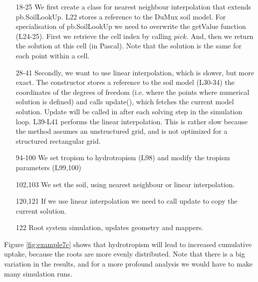 \begin{itemize}
\item[18-25] We first create a class for nearest neighbour interpolation that extends pb.SoilLookUp. L22 stores a reference to the DuMux soil model. For specialisation of pb.SoilLookUp we need to overwrite the getValue function (L24-25). First we retrieve the cell index by calling $pick$. And, then we return the solution at this cell (in Pascal). Note that the solution is the same for each point within a cell. 
\item[28-41] Secondly, we want to use linear interpolation, which is slower, but more exact. The constructor stores a reference to the soil model (L30-34) the coordinates of the degrees of freedom (i.e. where the points where numerical solution is defined) and calls update(), which fetches the current model solution. Update will be called in after each solving step in the simulation loop. L39-L41 performs the linear interpolation. This is rather slow because the method assumes an unstructured grid, and is not optimized for a structured rectangular grid. 
\item[94-100] We set tropism to hydrotropism (L98) and modify the tropism parameters (L99,100)
\item[102,103] We set the soil, using nearest neighbour or linear interpolation.
\item[120,121] If we use linear interpolation we need to call update to copy the current solution. 
\item[122] Root system simulation, updates geometry and mappers.

\end{itemize}

Figure \ref{fig:example7c} shows that hydrotropism will lead to increased cumulative uptake, because the roots are more evenly distributed. Note that there is a big variation in the results, and for a more profound analysis we would have to make many simulation runs. 

